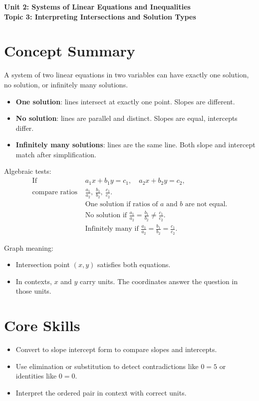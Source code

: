 \documentclass[12pt]{article}
\begin{document}
\begin{center}
    \LARGE \textbf{Unit 2: Systems of Linear Equations and Inequalities} \\[6pt]
    \Large \textbf{Topic 3: Interpreting Intersections and Solution Types}
\end{center}

\vspace{1em}

\section*{Concept Summary}

A system of two linear equations in two variables can have exactly one solution, no solution, or infinitely many solutions.

\begin{itemize}
    \item \textbf{One solution}: lines intersect at exactly one point. Slopes are different.
    \item \textbf{No solution}: lines are parallel and distinct. Slopes are equal, intercepts differ.
    \item \textbf{Infinitely many solutions}: lines are the same line. Both slope and intercept match after simplification.
\end{itemize}

Algebraic tests:
\[
\begin{aligned}
\text{If } &a_1x + b_1y = c_1,\quad a_2x + b_2y = c_2,\\
\text{compare ratios } &\frac{a_1}{a_2},\ \frac{b_1}{b_2},\ \frac{c_1}{c_2}.\\
&\text{One solution if ratios of }a\text{ and }b\text{ are not equal.}\\
&\text{No solution if } \frac{a_1}{a_2}=\frac{b_1}{b_2}\neq \frac{c_1}{c_2}.\\
&\text{Infinitely many if } \frac{a_1}{a_2}=\frac{b_1}{b_2}=\frac{c_1}{c_2}.
\end{aligned}
\]

Graph meaning:
\begin{itemize}
    \item Intersection point \((x,y)\) satisfies both equations.
    \item In contexts, \(x\) and \(y\) carry units. The coordinates answer the question in those units.
\end{itemize}

\section*{Core Skills}
\begin{itemize}
    \item Convert to slope intercept form to compare slopes and intercepts.
    \item Use elimination or substitution to detect contradictions like \(0=5\) or identities like \(0=0\).
    \item Interpret the ordered pair in context with correct units.
\end{itemize}
\end{document}
